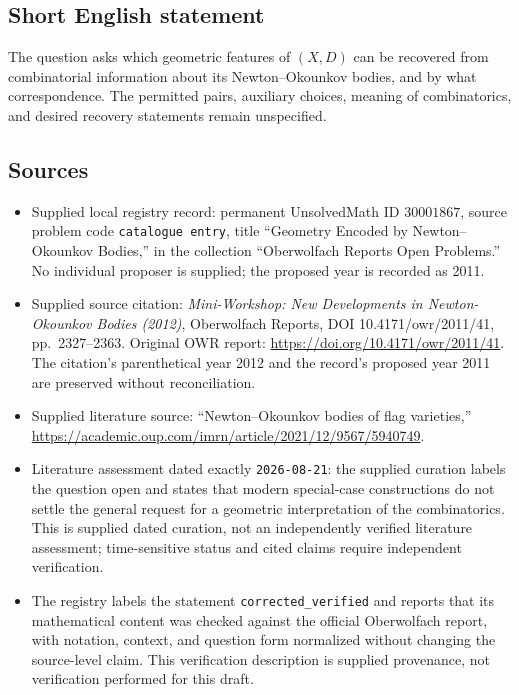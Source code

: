 \documentclass[11pt]{article}
\begin{document}
\subsection{Short English statement}
The question asks which geometric features of \((X,D)\) can be recovered from combinatorial information about its Newton--Okounkov bodies, and by what correspondence. The permitted pairs, auxiliary choices, meaning of combinatorics, and desired recovery statements remain unspecified.
\subsection{Sources}
\begin{itemize}
\item Supplied local registry record: permanent UnsolvedMath ID \(30001867\), source problem code \texttt{catalogue entry}, title ``Geometry Encoded by Newton--Okounkov Bodies,'' in the collection ``Oberwolfach Reports Open Problems.'' No individual proposer is supplied; the proposed year is recorded as 2011.
\item Supplied source citation: \emph{Mini-Workshop: New Developments in Newton-Okounkov Bodies (2012)}, Oberwolfach Reports, DOI 10.4171/owr/2011/41, pp.\ 2327--2363. Original OWR report: \url{https://doi.org/10.4171/owr/2011/41}. The citation's parenthetical year 2012 and the record's proposed year 2011 are preserved without reconciliation.
\item Supplied literature source: ``Newton--Okounkov bodies of flag varieties,'' \url{https://academic.oup.com/imrn/article/2021/12/9567/5940749}.
\item Literature assessment dated exactly \texttt{2026-08-21}: the supplied curation labels the question open and states that modern special-case constructions do not settle the general request for a geometric interpretation of the combinatorics. This is supplied dated curation, not an independently verified literature assessment; time-sensitive status and cited claims require independent verification.
\item The registry labels the statement \texttt{corrected\_verified} and reports that its mathematical content was checked against the official Oberwolfach report, with notation, context, and question form normalized without changing the source-level claim. This verification description is supplied provenance, not verification performed for this draft.
\end{itemize}
\end{document}
